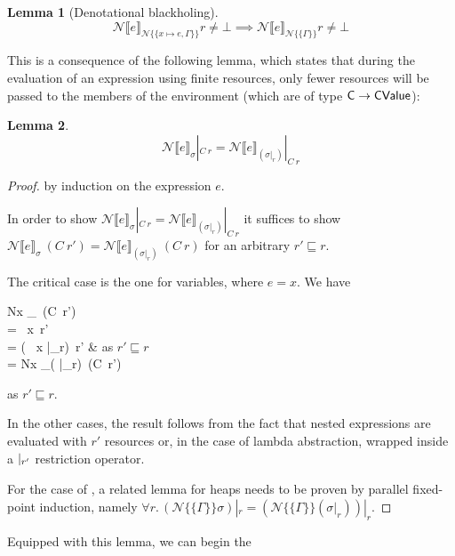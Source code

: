 \documentclass{jfp1}
\newtheorem{lemma}{Lemma}
\theoremstyle{nonumberbreak}
\newtheorem{proof}{Proof}
\newcommand{\sCValue}{\text{\textsf{CValue}}}
\newcommand{\sC}     {\text{\textsf{C}}}
\newcommand{\keyword}[1]{\text{\textsf{#1}}}
\newcommand{\dsemr}[2]{\mathcal N\!\llbracket #1 \rrbracket_{#2}}
\newcommand{\esemr}[1]{\mathcal N\!\!\{\!\!\!\{#1\}\!\!\!\}}
\newcommand{\Crestr}[2]{ #1 |_{#2}}
\begin{document}
\begin{lemma}[Denotational blackholing]
\label{lem_denblackhole}
\[
\dsemr{e}{\esemr{x\mapsto e, \Gamma}} r \ne \bot \implies \dsemr{e}{\esemr{\Gamma}} r \ne \bot
\]
\end{lemma}

This is a consequence of the following lemma, which states that during the evaluation of an expression using finite resources, only fewer resources will be passed to the members of the environment (which are of type $\sC \to \sCValue$):

\begin{lemma}
\[
\label{lem_denrestr}
\Crestr{\dsemr{e}\sigma}{C~r} = \Crestr{\dsemr{e}{(\Crestr{\sigma}{r})}}{C~r}
\]
\end{lemma}
\begin{proof}
by induction on the expression $e$.


In order to show $\Crestr{\dsemr{e}\sigma}{C~r} = \Crestr{\dsemr{e}{(\Crestr{\sigma}{r})}}{C~r}$ it suffices to show $\dsemr{e}\sigma~(C~r') = \dsemr{e}{(\Crestr{\sigma}{r})}~(C~r)$ for an arbitrary $r'\sqsubseteq r$.

The critical case is the one for variables, where $e = x$. We have
\begin{conteq}[oneline]
\dsemr{x}\sigma~(C~r')
\\
= \sigma~x~r' \\
= (\Crestr{\sigma~x}{r})~r' & as $r'\sqsubseteq r$ \\
= \dsemr{x}{(\Crestr{\sigma}{r})}~(C~r')
\end{conteq}
as $r'\sqsubseteq r$.

In the other cases, the result follows from the fact that nested expressions are evaluated with $r'$ resources or, in the case of lambda abstraction, wrapped inside a $\Crestr \strut {r'}$ restriction operator.

For the case of \keyword{let}, a related lemma for heaps needs to be proven by parallel fixed-point induction, namely $\forall r.\, \Crestr{(\esemr{\Gamma}\sigma)}r = \Crestr{(\esemr{\Gamma}{(\Crestr\sigma r)})}r$.
\end{proof}

Equipped with this lemma, we can begin the
\end{document}
